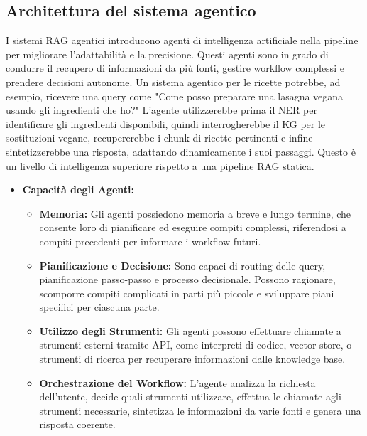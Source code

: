 \documentclass[a4paper, 11pt]{article}
\begin{document}
\subsection{Architettura del sistema agentico}
I sistemi RAG agentici introducono agenti di intelligenza artificiale nella pipeline per migliorare l'adattabilità e la precisione. \cite{what_is_agentic_rag_ibm} Questi agenti sono in grado di condurre il recupero di informazioni da più fonti, gestire workflow complessi e prendere decisioni autonome. Un sistema agentico per le ricette potrebbe, ad esempio, ricevere una query come "Come posso preparare una lasagna vegana usando gli ingredienti che ho?" L'agente utilizzerebbe prima il NER per identificare gli ingredienti disponibili, quindi interrogherebbe il KG per le sostituzioni vegane, recupererebbe i chunk di ricette pertinenti e infine sintetizzerebbe una risposta, adattando dinamicamente i suoi passaggi. Questo è un livello di intelligenza superiore rispetto a una pipeline RAG statica.
\begin{itemize}
    \item \textbf{Capacità degli Agenti:}
    \begin{itemize}
        \item \textbf{Memoria:} Gli agenti possiedono memoria a breve e lungo termine, che consente loro di pianificare ed eseguire compiti complessi, riferendosi a compiti precedenti per informare i workflow futuri. \cite{what_is_agentic_rag_ibm}
        \item \textbf{Pianificazione e Decisione:} Sono capaci di routing delle query, pianificazione passo-passo e processo decisionale. \cite{what_is_agentic_rag_ibm} Possono ragionare, scomporre compiti complicati in parti più piccole e sviluppare piani specifici per ciascuna parte. \cite{llm_agents_guide}
        \item \textbf{Utilizzo degli Strumenti:} Gli agenti possono effettuare chiamate a strumenti esterni tramite API, come interpreti di codice, vector store, o strumenti di ricerca per recuperare informazioni dalle knowledge base. \cite{what_is_agentic_rag_ibm}
        \item \textbf{Orchestrazione del Workflow:} L'agente analizza la richiesta dell'utente, decide quali strumenti utilizzare, effettua le chiamate agli strumenti necessarie, sintetizza le informazioni da varie fonti e genera una risposta coerente. \cite{agentic_rag_workflow}
    \end{itemize}
\end{itemize}
\end{document}

